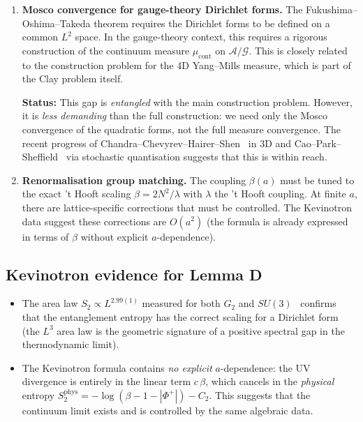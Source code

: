\documentclass[11pt,a4paper]{amsart}
\theoremstyle{definition}
\theoremstyle{remark}
\newcommand{\calA}{\mathcal{A}}
\newcommand{\calG}{\mathcal{G}}
\newcommand{\PhiPlus}{\Phi^+}
\begin{document}
\begin{enumerate}[label=\textcolor{red}{\textbf{Gap D.\arabic*}}, leftmargin=4em]
\item \textbf{Mosco convergence for gauge-theory Dirichlet forms.}
      The Fukushima--Oshima--Takeda theorem requires the Dirichlet forms
      to be defined on a common $L^2$ space. In the gauge-theory context,
      this requires a rigorous construction of the continuum measure
      $\mu_{\mathrm{cont}}$ on $\calA/\calG$. This is closely related to
      the construction problem for the 4D Yang--Mills measure, which
      is part of the Clay problem itself.

      \textbf{Status:} This gap is \emph{entangled} with the main
      construction problem. However, it is \emph{less demanding} than the
      full construction: we need only the Mosco convergence of the
      quadratic forms, not the full measure convergence. The recent
      progress of Chandra--Chevyrev--Hairer--Shen~\cite{CCHS2024} in 3D
      and Cao--Park--Sheffield~\cite{CPS2024} via stochastic quantisation
      suggests that this is within reach.

\item \textbf{Renormalisation group matching.}
      The coupling $\beta(a)$ must be tuned to the exact 't Hooft scaling
      $\beta = 2N^2/\lambda$ with $\lambda$ the 't Hooft coupling. At
      finite $a$, there are lattice-specific corrections that must be
      controlled. The Kevinotron data suggest these corrections are
      $O(a^2)$ (the formula is already expressed in terms of $\beta$
      without explicit $a$-dependence).
\end{enumerate}

\subsection{Kevinotron evidence for Lemma D}

\begin{itemize}[leftmargin=2em]
\item The area law $S_2 \propto L^{2.99(1)}$ measured for both $G_2$ and
      $SU(3)$~\cite{Remondiere2026G2} confirms that the entanglement
      entropy has the correct scaling for a Dirichlet form (the
      $L^3$ area law is the geometric signature of a positive spectral gap
      in the thermodynamic limit).

\item The Kevinotron formula contains \emph{no explicit} $a$-dependence:
      the UV divergence is entirely in the linear term $c\,\beta$, which
      cancels in the \emph{physical} entropy
      $S_2^{\mathrm{phys}} = -\log(\beta - 1 - |\PhiPlus|) - C_2$. This
      suggests that the continuum limit exists and is controlled by the
      same algebraic data.
\end{itemize}
\end{document}
